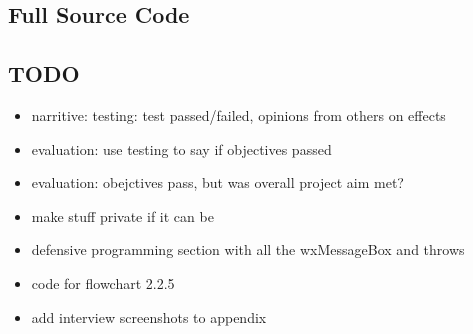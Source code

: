 \documentclass{article}
\begin{document}
	\subsection{Full Source Code}
	
	\subsection{TODO}
	\begin{itemize}
		\item narritive: testing: test passed/failed, opinions from others on effects
		\item evaluation: use testing to say if objectives passed
		\item evaluation: obejctives pass, but was overall project aim met?
		\item make stuff private if it can be
		\item defensive programming section with all the wxMessageBox and throws
		\item code for flowchart 2.2.5
		\item add interview screenshots to appendix
	\end{itemize}
	
\end{document}
